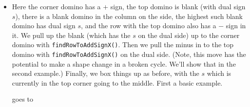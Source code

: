 \documentclass[12pt]{article}
\numberwithin{equation}{section}
\newcommand{\horizontalDominoRSShift}[4]{\filldraw [dominoRSStyle] (#2 - 1 + #4 + \eps, #1 - 1 + \eps) rectangle + (2 - \teps, 1 -\teps) node [dominoText] {$#3$};}
\newcommand{\verticalDominoRSShift}[4]{\filldraw [dominoRSStyle] (#2 - 1 + #4 + \eps,  #1 - 1 + \eps) rectangle + (1 - \teps,2 -\teps) node [dominoText] {$#3$};}
\begin{document}
\begin{itemize}
\begin{itemize}
      \item Here the corner domino has a $+$ sign, the top domino is blank (with dual sign $s$), there is a blank domino in the column on the side, the highest such blank domino has dual sign $s$, and the row with the top domino also has a $-$ sign in it.
      We pull up the blank (which has the $s$ on the dual side) up to the corner domino with \texttt{findRowToAddSignX()}.
      Then we pull the minus in to the top domino with \texttt{findRowToAddSignX()} on the dual side.
      (Note, this move has the potential to make a shape change in a broken cycle.
      We'll show that in the second example.)
      Finally, we box things up as before, with the $s$ which is currently in the top corner going to the middle.
      First a basic example.
      \begin{figure}[H]
        \centering
      \end{figure}
      goes to
      \begin{figure}[H]
        \centering
\end{figure}
\end{itemize}
\end{itemize}
\end{document}
